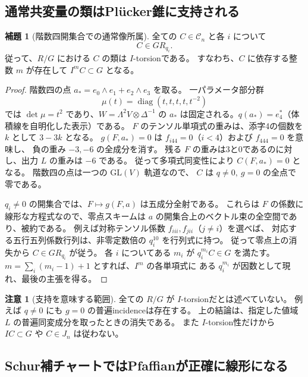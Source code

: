 \documentclass[a4paper,11pt]{ltjsarticle}
\theoremstyle{definition}
\newtheorem{lemma}[theorem]{補題}
\newtheorem{remark}[theorem]{注意}
\begin{document}
\subsection{通常共変量の類はPl\"ucker錐に支持される}

\begin{lemma}[階数四開集合での通常像所属]
\label{lem:v17-rank-four-support}
全ての $C\in\mathcal C_n$ と各 $i$ について
\[
 C\in G R_{q_i}.
\]
従って、$R/G$ における $C$ の類は $I$-torsionである。
すなわち、$C$ に依存する整数 $m$ が存在して
$I^mC\subset G$ となる。
\end{lemma}

\begin{proof}
階数四の点
$a_*=e_0\wedge e_1+e_2\wedge e_3$ を取る。
一パラメータ部分群
\[
 \mu(t)=\operatorname{diag}(t,t,t,t,t^{-2})
\]
では $\det\mu=t^2$ であり、$W=\Lambda^2V\otimes\Delta^{-1}$ の
$a_*$ は固定される。$q(a_*)=e_4^*$（体積線を自明化した表示）である。
$F$ のテンソル単項式の重みは、添字4の個数を $k$ として $3-3k$ となる。
$g(F,a_*)=0$ は $f_{i44}=0$（$i<4$）および $f_{444}=0$ を意味し、
負の重み $-3,-6$ の全成分を消す。
残る $F$ の重みは3と0であるのに対し、出力 $L$ の重みは $-6$ である。
従って多項式同変性により $C(F,a_*)=0$ となる。
階数四の点は一つの $\mathrm{GL}(V)$ 軌道なので、
$C$ は $q\ne0,\ g=0$ の全点で零である。

$q_i\ne0$ の開集合では、$F\mapsto g(F,a)$ は五成分全射である。
これらは $F$ の係数に線形な方程式なので、零点スキームは
$a$ の開集合上のベクトル束の全空間であり、被約である。
例えば対称テンソル係数 $f_{iii},f_{jii}$（$j\ne i$）を選べば、
対応する五行五列係数行列は、非零定数倍の $q_i^{10}$ を行列式に持つ。
従って零点上の消失から $C\in GR_{q_i}$ が従う。
各 $i$ についてある $m_i$ が $q_i^{m_i}C\in G$ を満たす。
$m=\sum_i(m_i-1)+1$ とすれば、$I^m$ の各単項式に
ある $q_i^{m_i}$ が因数として現れ、最後の主張を得る。
\end{proof}

\begin{remark}[支持を意味する範囲]
全ての $R/G$ が $I$-torsionだとは述べていない。
例えば $q\ne0$ にも $g=0$ の普遍incidenceは存在する。
上の結論は、指定した値域 $L$ の普遍同変成分を取ったときの消失である。
また $I$-torsion性だけから $IC\subset G$ や $C\in J_n$ は従わない。
\end{remark}

\subsection{Schur補チャートではPfaffianが正確に線形になる}
\end{document}
